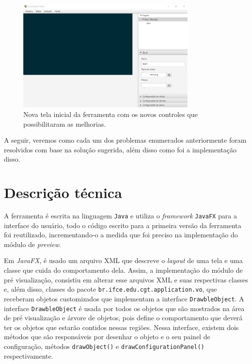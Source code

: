 \documentclass[12pt,oneside,openright,a4paper,english,brazil,sumario=tradicional]{abntex2}
\begin{document}
\begin{figure}[h]
\centering
\includegraphics[width=0.8\textwidth]{images/tela_inicial_2.jpg}
\caption{Nova tela inicial da ferramenta com os novos controles que possibilitaram as melhorias.}
\label{fig:tela_inicial_2}
\end{figure}

A seguir, veremos como cada um dos problemas enumerados anteriormente foram resolvidos com base na solução sugerida, além disso como foi a implementação disso.

\section{Descrição técnica}

 A ferramenta é escrita na linguagem \texttt{Java} e utiliza o \emph{framework} \texttt{JavaFX} para a interface do usuário, todo o código escrito para a primeira versão da ferramenta foi reutilizado, incrementando-o a medida que foi preciso na implementação do módulo de \textit{preview}.

Em \emph{JavaFX}, é usado um arquivo XML que descreve o \emph{layout} de uma tela e uma classe que cuida do comportamento dela. Assim, a implementação do módulo de pré visualização, consistiu em alterar esse arquivos XML e suas respectivas classes e, além disso, classes do pacote \texttt{br.ifce.edu.cgt.application.vo}, que receberam objetos customizados que implementam a interface \texttt{DrawbleObject}. A interface \texttt{DrawbleObject} é usada por todos os objetos que são mostrados na área de pré visualização e árvore de objetos, pois define o comportamento que deverá ter os objetos que estarão contidos nessas regiões. Nessa interface, existem dois métodos que são responsáveis por desenhar o objeto e o seu painel de configuração, métodos \texttt{drawObject()} e \texttt{drawConfigurationPanel()} respectivamente.
\end{document}
